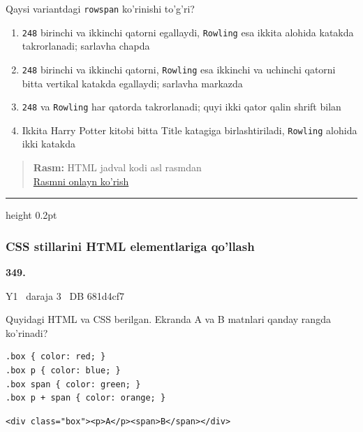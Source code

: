 \documentclass[10pt,a4paper,oneside]{article}
\begin{document}
\par
Qaysi variantdagi \texttt{rowspan} ko'rinishi to'g'ri?
\begin{enumerate}[label=\Alph*),leftmargin=9mm]
\item \texttt{248} birinchi va ikkinchi qatorni egallaydi, \texttt{Rowling} esa ikkita alohida katakda takrorlanadi; sarlavha chapda
\item \texttt{248} birinchi va ikkinchi qatorni, \texttt{Rowling} esa ikkinchi va uchinchi qatorni bitta vertikal katakda egallaydi; sarlavha markazda
\item \texttt{248} va \texttt{Rowling} har qatorda takrorlanadi; quyi ikki qator qalin shrift bilan
\item Ikkita Harry Potter kitobi bitta Title katagiga birlashtiriladi, \texttt{Rowling} alohida ikki katakda
\end{enumerate}
\begin{quote}\footnotesize\color{muted}\textbf{Rasm:} HTML jadval kodi asl rasmdan\\
\href{https://github.com/sarvar9417/attestatsiya/blob/main/public/kuzgi-demo/demo_q27_html.svg}{Rasmni onlayn ko'rish}
\end{quote}
\vspace{2mm}\hrule height 0.2pt \vspace{4mm}
\subsubsection{CSS stillarini HTML elementlariga qo'llash}
\hypertarget{q349}{\textbf{\color{ink}349.}}  {\color{muted}\scriptsize Y1 \textbullet\ daraja 3 \textbullet\ DB 681d4cf7}
\par
Quyidagi HTML va CSS berilgan. Ekranda A va B matnlari qanday rangda ko'rinadi?

\par
\begin{lstlisting}
.box { color: red; }
.box p { color: blue; }
.box span { color: green; }
.box p + span { color: orange; }
\end{lstlisting}
\par
\begin{lstlisting}
<div class="box"><p>A</p><span>B</span></div>
\end{lstlisting}
\end{document}
